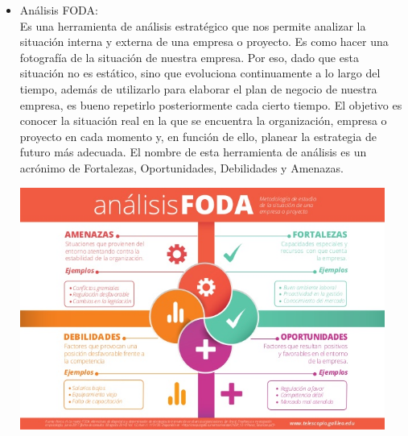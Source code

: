\begin{itemize}
\item Análisis FODA:
\\Es una herramienta de análisis estratégico que nos permite analizar la situación interna y externa de una empresa o proyecto. Es como hacer una fotografía de la situación de nuestra empresa. Por eso, dado que esta situación no es estático, sino que evoluciona continuamente a lo largo del tiempo, además de utilizarlo para elaborar el plan de negocio de nuestra empresa, es bueno repetirlo posteriormente cada cierto tiempo. El objetivo es conocer la situación real en la que se encuentra la organización, empresa o proyecto en cada momento y, en función de ello, planear la estrategia de futuro más adecuada. El nombre de esta herramienta de análisis es un acrónimo de Fortalezas, Oportunidades, Debilidades y Amenazas. 
		\begin{center}
		\includegraphics[width=12cm]{./Imagenes/Imagen3}
		\end{center}

	\end{itemize} 
	
